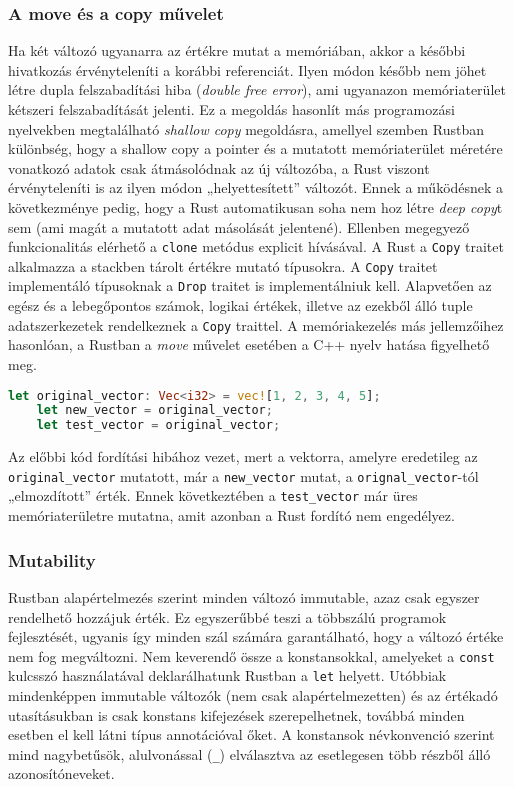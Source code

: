 \subsubsection{A move és a copy művelet}
Ha két változó ugyanarra az értékre mutat a memóriában, akkor a későbbi hivatkozás érvényteleníti a korábbi referenciát. Ilyen módon később nem jöhet létre dupla felszabadítási hiba (\textit{double free error}), ami ugyanazon memóriaterület kétszeri felszabadítását jelenti. Ez a megoldás hasonlít más programozási nyelvekben megtalálható \textit{shallow copy} megoldásra, amellyel szemben Rustban különbség, hogy a shallow copy a pointer és a mutatott memóriaterület méretére vonatkozó adatok csak átmásolódnak az új változóba, a Rust viszont érvényteleníti is az ilyen módon „helyettesített” változót. Ennek a működésnek a következménye pedig, hogy a Rust automatikusan soha nem hoz létre \textit{deep copy}t sem (ami magát a mutatott adat másolását jelentené). Ellenben megegyező funkcionalitás elérhető a \lstinline{clone} metódus explicit hívásával. A Rust a \lstinline{Copy} traitet alkalmazza a stackben tárolt értékre mutató típusokra. A \lstinline{Copy} traitet implementáló típusoknak a \lstinline{Drop} traitet is implementálniuk kell. Alapvetően az egész és a lebegőpontos számok, logikai értékek, illetve az ezekből álló tuple adatszerkezetek rendelkeznek a \lstinline{Copy} traittel. A memóriakezelés más jellemzőihez hasonlóan, a Rustban a \textit{move} művelet esetében a C++ nyelv hatása figyelhető meg.
\begin{lstlisting}[language=Rust, style=boxed]
    let original_vector: Vec<i32> = vec![1, 2, 3, 4, 5];
    let new_vector = original_vector;
    let test_vector = original_vector;
\end{lstlisting}
Az előbbi kód fordítási hibához vezet, mert a vektorra, amelyre eredetileg az \\ \lstinline{original_vector} mutatott,  már a \lstinline{new_vector} mutat, a \lstinline{orignal_vector}-tól „elmozdított” érték. Ennek következtében a \lstinline{test_vector} már üres memóriaterületre mutatna, amit azonban a Rust fordító nem engedélyez.

\subsubsection{Mutability}
Rustban alapértelmezés szerint minden változó immutable, azaz csak egyszer rendelhető hozzájuk érték. Ez egyszerűbbé teszi a többszálú programok fejlesztését, ugyanis így minden szál számára garantálható, hogy a változó értéke nem fog megváltozni. Nem keverendő össze a konstansokkal, amelyeket a \texttt{const} kulcsszó használatával deklarálhatunk Rustban a \texttt{let} helyett. Utóbbiak mindenképpen immutable változók (nem csak alapértelmezetten) és az értékadó utasításukban is csak konstans kifejezések szerepelhetnek, továbbá minden esetben el kell látni típus annotációval őket. A konstansok névkonvenció szerint mind nagybetűsök, alulvonással (\lstinline{_}) elválasztva az esetlegesen több részből álló azonosítóneveket.

